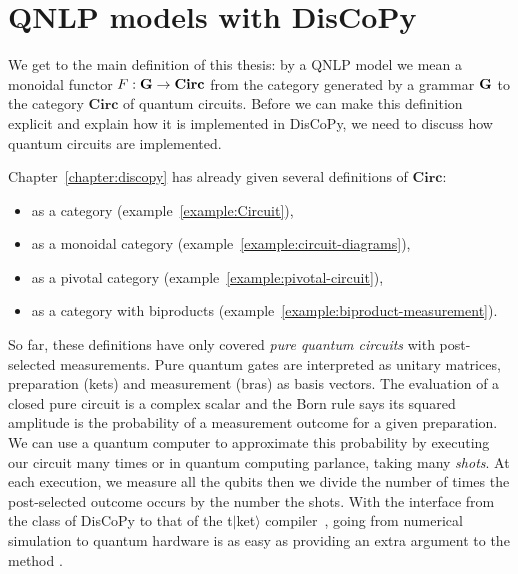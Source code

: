 
\section{QNLP models with DisCoPy}

We get to the main definition of this thesis: by a QNLP model we mean a monoidal functor $F : \mathbf{G} \to \mathbf{Circ}$ from the category generated by a grammar $\mathbf{G}$ to the category $\mathbf{Circ}$ of quantum circuits.
Before we can make this definition explicit and explain how it is implemented in DisCoPy, we need to discuss how quantum circuits are implemented.

Chapter~\ref{chapter:discopy} has already given several definitions of $\mathbf{Circ}$:
\begin{itemize}
    \item as a category (example~\ref{example:Circuit}),
    \item as a monoidal category (example~\ref{example:circuit-diagrams}),
    \item as a pivotal category (example~\ref{example:pivotal-circuit}),
    \item as a category with biproducts (example~\ref{example:biproduct-measurement}).
\end{itemize}
So far, these definitions have only covered \emph{pure quantum circuits} with post-selected measurements. Pure quantum gates are interpreted as unitary matrices, preparation (kets) and measurement (bras) as basis vectors.
The evaluation of a closed pure circuit is a complex scalar and the Born rule says its squared amplitude is the probability of a measurement outcome for a given preparation.
We can use a quantum computer to approximate this probability by executing our circuit many times or in quantum computing parlance, taking many \emph{shots}.
At each execution, we measure all the qubits then we divide the number of times the post-selected outcome occurs by the number the shots.
With the interface from the  class of DisCoPy to that of the t$\vert$ket$\rangle$ compiler~\cite{SivarajahEtAl20}, going from numerical simulation to quantum hardware is as easy as providing an extra argument  to the method .


